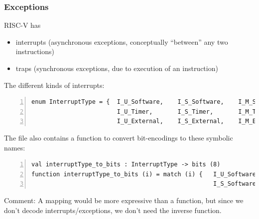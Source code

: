 \documentclass[aspectratio=169]{beamer}
\newcommand{\slidefont}{\scriptsize}
\begin{document}
\begin{frame}[fragile]
  \frametitle{Exceptions}

  \slidefont

  RISC-V has
  \begin{itemize}
  \item interrupts (asynchronous exceptions, conceptually ``between'' any two instructions)
  \item traps (synchronous exceptions, due to execution of an instruction)
  \end{itemize}

  \vspace{1ex}

  The different kinds of interrupts:

  \vspace{1ex}

  \begin{Verbatim}[frame=single, numbers=left, label = File riscv\_types.sail]
enum InterruptType = {  I_U_Software,    I_S_Software,    I_M_Software,
                        I_U_Timer,       I_S_Timer,       I_M_Timer,
                        I_U_External,    I_S_External,    I_M_External    }
  \end{Verbatim}

  The file also contains a function to convert bit-encodings to these symbolic names:

  \vspace{1ex}

  \begin{Verbatim}[frame=single, numbers=left, label = File riscv\_types.sail]
val interruptType_to_bits : InterruptType -> bits (8)
function interruptType_to_bits (i) = match (i) {   I_U_Software => 0x00,
                                                   I_S_Software => 0x01,  ... }
  \end{Verbatim}

  Comment: A mapping would be more expressive than a function, but
  since we don't decode interrupts/exceptions, we don't need the inverse
  function.

\end{frame}

\end{document}
